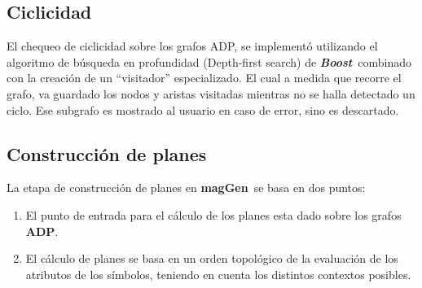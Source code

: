 \documentclass[runningheads,a4paper]{llncs}
\newcommand{\textbtt}[1]{\texttt{\textbf{#1}}}
\newcommand{\maggen}{\textbf{magGen}}
\newcommand{\boost}{\textit{\textbf{Boost}}}
\begin{document}
\subsection{Ciclicidad}

El chequeo de ciclicidad sobre los grafos ADP, se implementó utilizando el algoritmo de búsqueda en profundidad (Depth-first search) de \boost\ combinado con la creación de un ``visitador'' especializado. El cual a medida que recorre el grafo, va guardado los nodos y aristas visitadas mientras no se halla detectado un ciclo. Ese subgrafo es mostrado al usuario en caso de error, sino es descartado.



%
%
%

\subsection{Construcción de planes}
\label{subsec:const-planes}
La etapa de construcción de planes en \maggen\ se basa en dos puntos:

\begin{enumerate}
\item El punto de entrada para el cálculo de los planes esta dado sobre los grafos \textbf{ADP}. 
\item El cálculo de planes se basa en un orden topológico de la evaluación de los atributos de los símbolos, teniendo en cuenta los distintos contextos posibles.
\end{enumerate}
\end{document}

